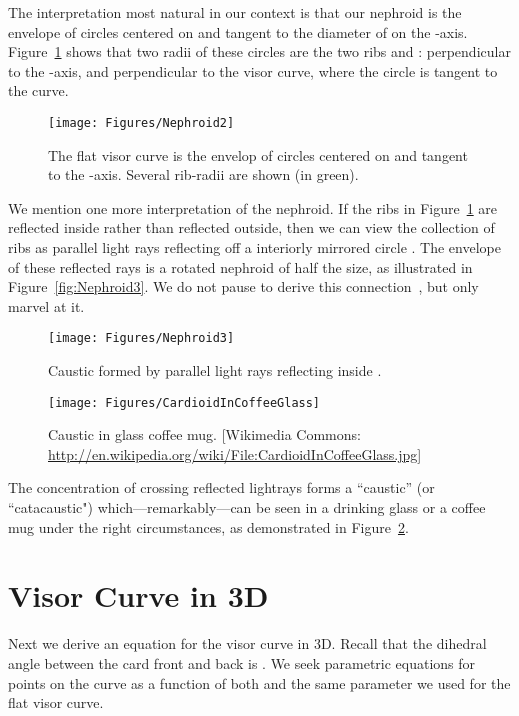 \pdfoutput=1  \documentclass[]{article}
\newcommand{\figlab}[1]{\label{fig:#1}}
\newcommand{\figref}[1]{\ref{fig:#1}}
\begin{document}
The interpretation most natural in our context is that our nephroid is
the envelope of circles centered on 
 and tangent to the diameter of  on the -axis.
Figure~\figref{Nephroid2} shows that two radii of these circles are the two ribs  and :
 perpendicular to the -axis, and  perpendicular to the visor curve, where
the circle is tangent to the curve.
\begin{figure}[htbp]
\centering
\texttt{[image: Figures/Nephroid2]}
\caption{The flat visor curve is the envelop of circles centered on  and tangent to
the -axis. Several rib-radii are shown (in green).}
\figlab{Nephroid2}
\end{figure}


We mention one more interpretation of the nephroid.  If the ribs  in
Figure~\figref{Nephroid2} are reflected inside  rather than reflected outside,
then we can view the collection of ribs  as parallel light rays reflecting
off a interiorly mirrored circle .  The envelope of these reflected rays is
a rotated nephroid of half the size, as illustrated in
Figure~\figref{Nephroid3}.  
We do not pause to derive this connection~\cite[p.~158]{w-pdcig-91}, but
only marvel at it.
\begin{figure}[htbp]
\begin{minipage}[h]{\linewidth}
\centering
\texttt{[image: Figures/Nephroid3]}
\caption{Caustic formed by parallel light rays reflecting inside .}
\figlab{Nephroid3}
\vspace{24pt}
\centering
\texttt{[image: Figures/CardioidInCoffeeGlass]}
\caption{Caustic in glass coffee mug.  
[Wikimedia Commons:
\protect\url{http://en.wikipedia.org/wiki/File:CardioidInCoffeeGlass.jpg}]
}
\figlab{CardioidInCoffeeGlass}
\end{minipage}
\end{figure}
The concentration of crossing reflected lightrays forms a ``caustic'' (or ``catacaustic")
which---remarkably---can be seen
in a drinking glass or a coffee mug
under the right circumstances,
as demonstrated in
Figure~\figref{CardioidInCoffeeGlass}.


\section{Visor Curve in 3D}
Next we derive an equation for the visor curve in 3D.
Recall that the dihedral angle between the card front and back is .
We seek parametric equations for points on the curve 
as a function of both  and the same parameter  we used for the flat visor curve.
\end{document}
